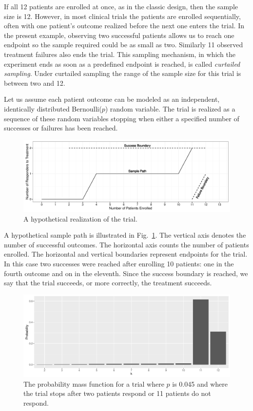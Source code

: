 \documentclass[review]{elsarticle}
\begin{document}
If all 12 patients are enrolled at once, as in the classic
design, then the sample size is 12. However, in most clinical trials the
patients are enrolled sequentially, often with one patient's outcome realized
before the next one enters the trial. In the present example, observing two
successful patients allows us to reach one endpoint so the sample required
could be as small as two. Similarly 11
observed treatment failures also ends the trial. This sampling mechanism, in
which the experiment ends as soon as a predefined endpoint is reached, is
called {\em curtailed sampling}. Under curtailed sampling the range of the
sample size for this trial is between two and 12.

Let us assume each patient outcome can be modeled as an independent,
identically distributed Bernoulli($p$) random variable. The trial is realized
as a sequence of these random variables stopping when either a
specified number of successes or failures has been reached. 

\begin{figure}[bp!]
\includegraphics[width=\textwidth]{KanePlot.pdf}
\caption{
A hypothetical realization of the trial.
}
\label{fig:kane_viz}
\end{figure}

A hypothetical sample path is illustrated in Fig.~\ref{fig:kane_viz}.
The vertical axis denotes the number of
successful outcomes. The horizontal axis counts the number of patients 
enrolled. The horizontal and vertical boundaries represent
endpoints for the trial. In this case two successes were reached after
enrolling 10 patients: one in the fourth outcome and on in the eleventh.
Since the success boundary is reached, we say that the trial succeeds,
or more correctly, the treatment succeeds.

\begin{figure}[bp!]
\centering
\includegraphics[width=\textwidth]{snb-first-plot.pdf}
\caption{
The probability mass function for a trial where $p$ 
is 0.045 and where the trial stops
after two patients respond or 11 patients do not respond.
}
\label{fig:first-plot}
\end{figure}
\end{document}
